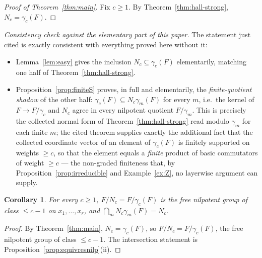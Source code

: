 \documentclass{amsart}
\newtheorem{corollary}{Corollary}
\theoremstyle{definition}
\theoremstyle{remark}
\begin{document}
\begin{proof}[Proof of Theorem~\ref{thm:main}]
Fix $c\ge1$. By Theorem~\ref{thm:hall-strong}, $N_c=\gamma_c(F)$.
\end{proof}

\noindent\emph{Consistency check against the elementary part of this paper.} The
statement just cited is exactly consistent with everything proved here without it:
\begin{itemize}
\item Lemma~\ref{lem:easy} gives the inclusion $N_c\subseteq\gamma_c(F)$
elementarily, matching one half of Theorem~\ref{thm:hall-strong}.
\item Proposition~\ref{prop:finiteS} proves, in full and elementarily, the
\emph{finite-quotient shadow} of the other half: $\gamma_c(F)\subseteq N_c\gamma_m(F)$
for every $m$, i.e.\ the kernel of $F\to F/\gamma_c$ and $N_c$ agree in every nilpotent
quotient $F/\gamma_m$. This is precisely the collected normal form of
Theorem~\ref{thm:hall-strong} read modulo $\gamma_m$ for each finite $m$; the cited
theorem supplies exactly the additional fact that the collected coordinate vector of an
element of $\gamma_c(F)$ is finitely supported on weights $\ge c$, so that the element
equals a \emph{finite} product of basic commutators of weight $\ge c$ --- the
non-graded finiteness that, by Proposition~\ref{prop:irreducible} and
Example~\ref{ex:Z}, no layerwise argument can supply.
\end{itemize}

\begin{corollary}\label{cor:nilp}
For every $c\ge1$, $F/N_c=F/\gamma_c(F)$ is the free nilpotent group of class $\le
c-1$ on $x_1,\dots,x_r$, and $\bigcap_{m}N_c\gamma_m(F)=N_c$.
\end{corollary}
\begin{proof}
By Theorem~\ref{thm:main}, $N_c=\gamma_c(F)$, so $F/N_c=F/\gamma_c(F)$, the free
nilpotent group of class $\le c-1$. The intersection statement is
Proposition~\ref{prop:equivresnilp}(ii).
\end{proof}
\end{document}
